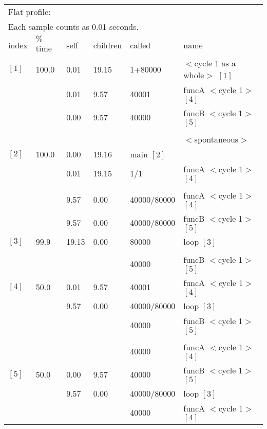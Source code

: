 \documentclass[11pt]{article}
\begin{document}
\begin{table}[H]
\begin{tabular}{l l l l l l}
\multicolumn{6}{l}{Flat profile:}\\
\multicolumn{6}{l}{Each sample counts as 0.01 seconds.}\\
index & $\%$ time   & self  &children    &called   & name\\
$[1]$   & 100.0   & 0.01  & 19.15      & 1+80000  & $<$cycle 1 as a whole$>$ $[1]$\\
            &&    0.01   & 9.57  & 40001         &   funcA $<$cycle 1$>$ $[4]$\\
          &&      0.00   & 9.57   &40000           &  funcB $<$cycle 1$>$ $[5]$\\
\hline \\
                                              &&&&&   $<$spontaneous$>$\\
$[2]$  &  100.0   & 0.00  & 19.16      &           main $[2]$\\
         &&       0.01 &  19.15     &  1/1           &funcA $<$cycle 1$>$ $[4]$\\
\hline \\
           &&    9.57  &  0.00   &40000/80000      & funcA $<$cycle 1$>$ $[4]$\\
        &&        9.57  &  0.00   &40000/80000      & funcB $<$cycle 1$>$ $[5]$\\
$[3]$   & 99.9  & 19.15 &   0.00 &  80000         &loop $[3]$\\
\hline \\      
&&&&                         40000             &funcB $<$cycle 1$>$ $[5]$\\
$[4]$  &   50.0 &   0.01 &   9.57   &40001        & funcA $<$cycle 1$>$ $[4]$\\
         &&       9.57 &  0.00  &40000/80000     &  loop $[3]$\\
               &&&&                40000           &  funcB $<$cycle 1$>$ $[5]$\\
\hline \\
             &&&&                  40000            & funcA $<$cycle 1$>$ $[4]$\\
$[5]$   & 50.0   & 0.00  &  9.57   &40000       &  funcB $<$cycle 1$>$ $[5]$\\
             &&   9.57   & 0.00  & 40000/80000    &   loop $[3]$\\
             &&&&                  40000         &    funcA $<$cycle 1$>$ $[4]$\\
\hline
\end{tabular}
\end{table}
\end{document}
